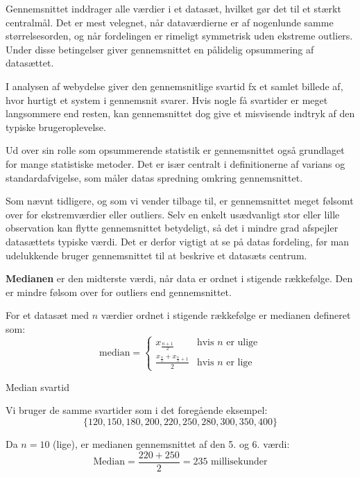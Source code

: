 Gennemsnittet inddrager alle værdier i et datasæt, hvilket gør det til et stærkt centralmål. Det er mest velegnet, når dataværdierne er af nogenlunde samme størrelsesorden, og når fordelingen er rimeligt symmetrisk uden ekstreme outliers. Under disse betingelser giver gennemsnittet en pålidelig opsummering af datasættet.

I analysen af webydelse giver den gennemsnitlige svartid fx et samlet billede af, hvor hurtigt et system i gennemsnit svarer. Hvis nogle få svartider er meget langsommere end resten, kan gennemsnittet dog give et misvisende indtryk af den typiske brugeroplevelse.

Ud over sin rolle som opsummerende statistik er gennemsnittet også grundlaget for mange statistiske metoder. Det er især centralt i definitionerne af varians og standardafvigelse, som måler datas spredning omkring gennemsnittet.

\begin{remark}
    Som nævnt tidligere, og som vi vender tilbage til, er gennemsnittet meget følsomt over for ekstremværdier eller outliers. Selv en enkelt usædvanligt stor eller lille observation kan flytte gennemsnittet betydeligt, så det i mindre grad afspejler datasættets typiske værdi.
    Det er derfor vigtigt at se på datas fordeling, før man udelukkende bruger gennemsnittet til at beskrive et datasæts centrum.
\end{remark}

\textbf{Medianen} er den midterste værdi, når data er ordnet i stigende rækkefølge. Den er mindre følsom over for outliers end gennemsnittet.

\begin{definition}[Median]
    For et datasæt med $n$ værdier ordnet i stigende rækkefølge er medianen defineret som:
    \[
    \text{median} =
    \begin{cases}
        x_{\frac{n+1}{2}} & \text{hvis } n \text{ er ulige} \\
        \frac{x_{\frac{n}{2}} + x_{\frac{n}{2}+1}}{2} & \text{hvis } n \text{ er lige}
    \end{cases}
    \]
\end{definition}

\begin{example} Median svartid

Vi bruger de samme svartider som i det foregående eksempel:
\[
\{120, 150, 180, 200, 220, 250, 280, 300, 350, 400\}
\]

Da $n = 10$ (lige), er medianen gennemsnittet af den 5. og 6. værdi:
\[
\text{Median} = \frac{220 + 250}{2} = 235 \text{ millisekunder}
\]
\end{example}

